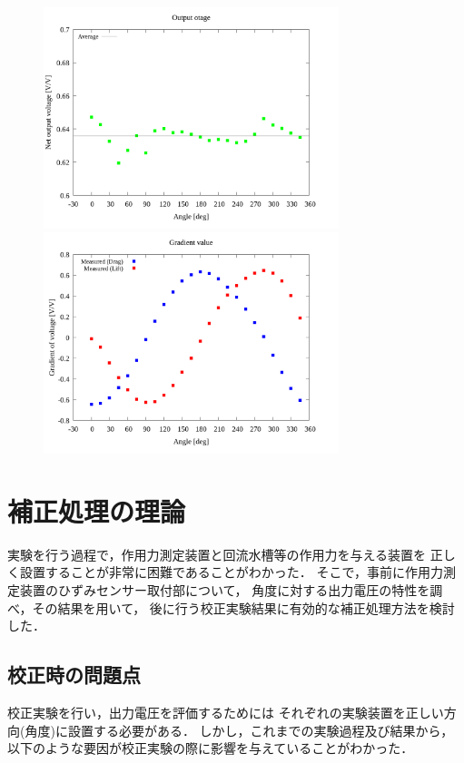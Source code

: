 \documentclass[twocolumn,a4j]{jsarticle}
\begin{document}
\newpage

\begin{figure}[htbp]
    \footnotesize
    \begin{center}
        \includegraphics[width=86mm]{../graphes/1-1/05/05_summary-outputvoltage.png}
        \caption{}
        \includegraphics[width=86mm]{../graphes/1-1/05/05_summary-wave.png}
        \caption{}
    \end{center}
\end{figure}

\newpage


\newpage

\section{補正処理の理論}
実験を行う過程で，作用力測定装置と回流水槽等の作用力を与える装置を
正しく設置することが非常に困難であることがわかった．
そこで，事前に作用力測定装置のひずみセンサー取付部について，
角度に対する出力電圧の特性を調べ，その結果を用いて，
後に行う校正実験結果に有効的な補正処理方法を検討した．\\

\subsection{校正時の問題点}
校正実験を行い，出力電圧を評価するためには
それぞれの実験装置を正しい方向(角度)に設置する必要がある．
しかし，これまでの実験過程及び結果から，
以下のような要因が校正実験の際に影響を与えていることがわかった．
\end{document}
